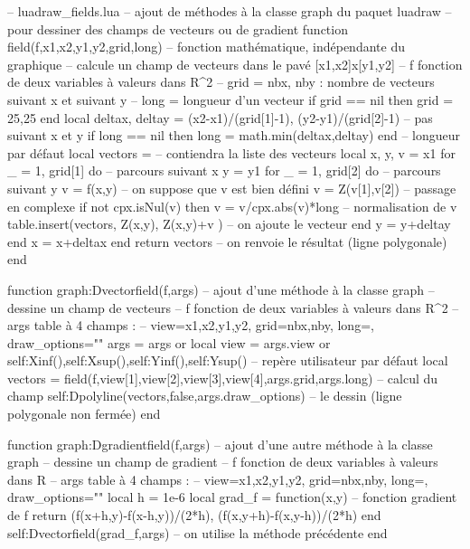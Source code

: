 \documentclass[%
10pt,%
a4paper,%
french,%
]%
{article}%
\begin{document}
\begin{Luacode}
-- luadraw_fields.lua
-- ajout de méthodes à la classe graph du paquet luadraw
-- pour dessiner des champs de vecteurs ou de gradient
function field(f,x1,x2,y1,y2,grid,long)  -- fonction mathématique, indépendante du graphique
-- calcule un champ de vecteurs dans le pavé [x1,x2]x[y1,y2]
-- f fonction de deux variables à valeurs dans R^2
-- grid = {nbx, nby} : nombre de vecteurs suivant x et suivant y
-- long = longueur d'un vecteur
    if grid == nil then grid = {25,25} end
    local deltax, deltay = (x2-x1)/(grid[1]-1), (y2-y1)/(grid[2]-1) -- pas suivant x et y
    if long == nil then long = math.min(deltax,deltay) end -- longueur par défaut
    local vectors = {} -- contiendra la liste des vecteurs
    local x, y, v = x1 
    for _ = 1, grid[1] do -- parcours suivant x
        y = y1
        for _ = 1, grid[2] do -- parcours suivant y
            v = f(x,y) -- on suppose que v est bien défini
            v = Z(v[1],v[2]) -- passage en complexe
            if not cpx.isNul(v) then
                v = v/cpx.abs(v)*long -- normalisation de v
                table.insert(vectors, {Z(x,y), Z(x,y)+v} ) -- on ajoute le vecteur
            end
            y = y+deltay
        end
        x = x+deltax
    end
    return vectors -- on renvoie le résultat (ligne polygonale)
end

function graph:Dvectorfield(f,args) -- ajout d'une méthode à la classe graph
-- dessine un champ de vecteurs
-- f fonction de deux variables à valeurs dans R^2
-- args table à 4 champs :
-- { view={x1,x2,y1,y2}, grid={nbx,nby}, long=, draw_options=""}
    args = args or {}
    local view = args.view or {self:Xinf(),self:Xsup(),self:Yinf(),self:Ysup()} -- repère utilisateur par défaut
    local vectors = field(f,view[1],view[2],view[3],view[4],args.grid,args.long) -- calcul du champ
    self:Dpolyline(vectors,false,args.draw_options) -- le dessin (ligne polygonale non fermée)
end

function graph:Dgradientfield(f,args) -- ajout d'une autre méthode à la classe graph
-- dessine un champ de gradient
-- f fonction de deux variables à valeurs dans R
-- args table à 4 champs :
-- { view={x1,x2,y1,y2}, grid={nbx,nby}, long=, draw_options=""}
    local h = 1e-6
    local grad_f = function(x,y) -- fonction gradient de f
        return { (f(x+h,y)-f(x-h,y))/(2*h), (f(x,y+h)-f(x,y-h))/(2*h) }
    end
    self:Dvectorfield(grad_f,args) -- on utilise la méthode précédente
end
\end{Luacode}
\end{document}
